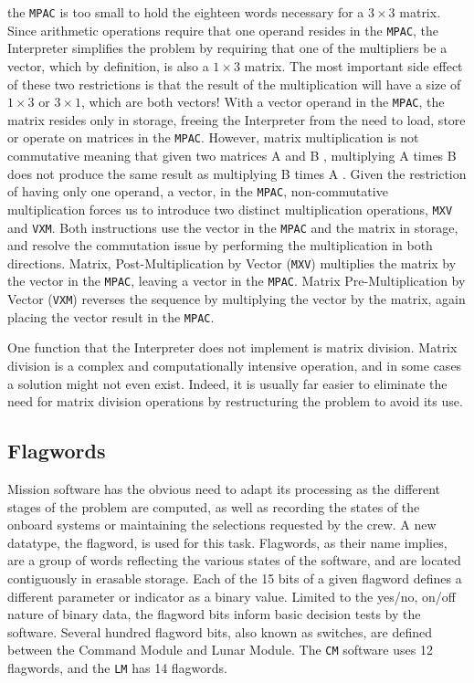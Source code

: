 \documentclass[refcap, oxford]{ahsan}
\begin{document}
the \texttt{MPAC} is too small to hold the eighteen words necessary for a $3 \times 3$ matrix. Since arithmetic operations require that one operand resides in the \texttt{MPAC}, the Interpreter simplifies the problem by requiring that one of the multipliers be a vector, which by definition, is also a $1 \times 3$ matrix. The most important side effect of these two restrictions is that the result of the multiplication will have a size of $1 \times 3$ or $3 \times 1$, which are both vectors! With a vector operand in the \texttt{MPAC}, the matrix resides only in storage, freeing the Interpreter from the need to load, store or operate on matrices in the \texttt{MPAC}. However, matrix multiplication is not commutative meaning that given two matrices A and B , multiplying A times B does not produce the same result as multiplying B times A . Given the restriction of having only one operand, a vector, in the \texttt{MPAC}, non-commutative multiplication forces us to introduce two distinct multiplication operations, \texttt{MXV} and \texttt{VXM}. Both instructions use the vector in the \texttt{MPAC} and the matrix in storage, and resolve the commutation issue by performing the multiplication in both directions. Matrix, Post-Multiplication by Vector (\texttt{MXV}) multiplies the matrix by the vector in the \texttt{MPAC}, leaving a vector in the \texttt{MPAC}. Matrix Pre-Multiplication by Vector (\texttt{VXM}) reverses the sequence by multiplying the vector by the matrix, again placing the vector result in the \texttt{MPAC}.

One function that the Interpreter does not implement is matrix division. Matrix division is a complex and computationally intensive operation, and in some cases a solution might not even exist. Indeed, it is usually far easier to eliminate the need for matrix division operations by restructuring the problem to avoid its use.


\subsection{Flagwords}
Mission software has the obvious need to adapt its processing as the different stages of the problem are computed, as well as recording the states of the onboard systems or maintaining the selections requested by the crew. A new datatype, the flagword, is used for this task. Flagwords, as their name implies, are a group of words reflecting the various states of the software, and are located contiguously in erasable storage. Each of the 15 bits of a given flagword defines a different parameter or indicator as a binary value. Limited to the yes/no, on/off nature of binary data, the flagword bits inform basic decision tests by the software. Several hundred flagword bits, also known as switches, are defined between the Command Module and Lunar Module. The \texttt{CM} software uses 12 flagwords, and the \texttt{LM} has 14 flagwords.
\end{document}

